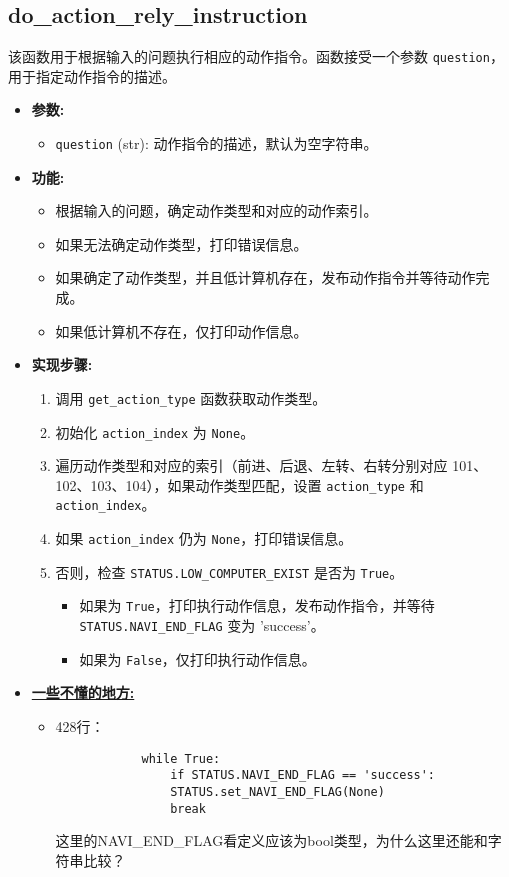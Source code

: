 \documentclass[]{article}
\begin{document}
\subsection{do\_action\_rely\_instruction}
该函数用于根据输入的问题执行相应的动作指令。函数接受一个参数 \texttt{question}，用于指定动作指令的描述。

\begin{itemize}
	\item \textbf{参数:}
	\begin{itemize}
		\item \texttt{question} (str): 动作指令的描述，默认为空字符串。
	\end{itemize}
	\item \textbf{功能:}
	\begin{itemize}
		\item 根据输入的问题，确定动作类型和对应的动作索引。
		\item 如果无法确定动作类型，打印错误信息。
		\item 如果确定了动作类型，并且低计算机存在，发布动作指令并等待动作完成。
		\item 如果低计算机不存在，仅打印动作信息。
	\end{itemize}
	\item \textbf{实现步骤:}
	\begin{enumerate}
		\item 调用 \texttt{get\_action\_type} 函数获取动作类型。
		\item 初始化 \texttt{action\_index} 为 \texttt{None}。
		\item 遍历动作类型和对应的索引（前进、后退、左转、右转分别对应 101、102、103、104），如果动作类型匹配，设置 \texttt{action\_type} 和 \texttt{action\_index}。
		\item 如果 \texttt{action\_index} 仍为 \texttt{None}，打印错误信息。
		\item 否则，检查 \texttt{STATUS.LOW\_COMPUTER\_EXIST} 是否为 \texttt{True}。
		\begin{itemize}
			\item 如果为 \texttt{True}，打印执行动作信息，发布动作指令，并等待 \texttt{STATUS.NAVI\_END\_FLAG} 变为 'success'。
			\item 如果为 \texttt{False}，仅打印执行动作信息。
		\end{itemize}
	\end{enumerate}
	\item \textbf{\underline{一些不懂的地方:}}
	\begin{itemize}
		\item  428行：\begin{verbatim}
			while True:
				if STATUS.NAVI_END_FLAG == 'success':
				STATUS.set_NAVI_END_FLAG(None)
				break
		\end{verbatim}\textcolor{mycolor}{这里的NAVI\_END\_FLAG看定义应该为bool类型，为什么这里还能和字符串比较？}     
	\end{itemize}
\end{itemize}
\end{document}
